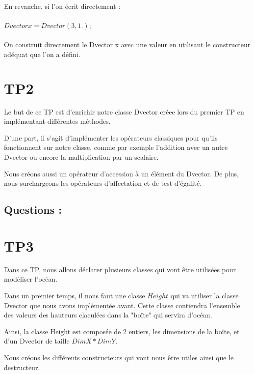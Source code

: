 \documentclass{article}
\begin{document}
En revanche, si l'on écrit directement : \\ \\ $Dvector x = Dvector(3, 1.);$ \\ \\

On construit directement le Dvector x avec une valeur en utilisant le constructeur adéquat que l'on a défini.


\vspace{1cm}

\section{TP2}

Le but de ce TP est d'enrichir notre classe Dvector créee lors du premier TP en implémentant différentes méthodes.

D'une part, il s'agit d'implémenter les opérateurs classiques pour qu'ils fonctionnent sur notre classe, comme par exemple l'addition avec un autre Dvector ou encore la multiplication par un scalaire.

Nous créons aussi un opérateur d'accession à un élément du Dvector. De plus, nous surchargeons les opérateurs d'affectation et de test d'égalité.

\vspace{0.5cm}

\subsection{Questions :}



\vspace{1cm}

\section{TP3}

Dans ce TP, nous allons déclarer plusieurs classes qui vont être utilisées pour modéliser l'océan.

Dans un premier temps, il nous faut une classe $Height$ qui va utiliser la classe Dvector que nous avons implémentée avant. Cette classe contiendra l'ensemble des valeurs des hauteurs claculées dans la "boîte" qui servira d'océan.

Ainsi, la classe Height est composée de 2 entiers, les dimensions de la boîte, et d'un Dvector de taille $DimX * DimY$.

Nous créons les différents constructeurs qui vont nous être utiles ainsi que le destructeur.
\end{document}
